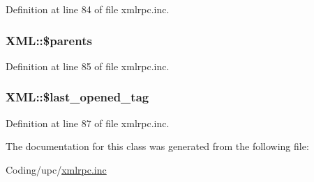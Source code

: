 Definition at line 84 of file xmlrpc.inc.\hypertarget{classXML_c10be009a77c59e80ce5562d4dd35532}{
\subsubsection{\setlength{\rightskip}{0pt plus 5cm}XML::\$parents}}
\label{classXML_c10be009a77c59e80ce5562d4dd35532}




Definition at line 85 of file xmlrpc.inc.\hypertarget{classXML_60e7e74df6643f50e0c6ea8252554b3d}{
\subsubsection{\setlength{\rightskip}{0pt plus 5cm}XML::\$last\_\-opened\_\-tag}}
\label{classXML_60e7e74df6643f50e0c6ea8252554b3d}




Definition at line 87 of file xmlrpc.inc.

The documentation for this class was generated from the following file:\begin{CompactItemize}
\item 
Coding/upc/\hyperlink{xmlrpc_8inc}{xmlrpc.inc}\end{CompactItemize}
